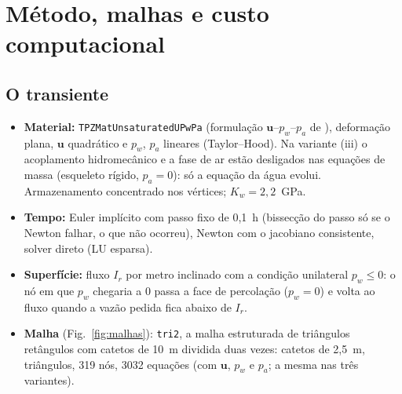 \section{Método, malhas e custo computacional}\label{sec:metodo}

\subsection{O transiente}
\begin{itemize}
  \item \textbf{Material:} \texttt{TPZMatUnsaturatedUPwPa} (formulação $\mathbf u$--$p_w$--$p_a$ de
    ), deformação plana, $\mathbf u$ quadrático e $p_w$, $p_a$ lineares (Taylor--Hood). Na
    variante (iii) o acoplamento hidromecânico e a fase de ar estão desligados nas equações de massa (esqueleto rígido,
    $p_a = 0$): só a equação da água evolui. Armazenamento concentrado nos vértices; $K_w = 2{,}2$~GPa.
  \item \textbf{Tempo:} Euler implícito com passo fixo de 0,1~h (bissecção do passo só se o Newton falhar, o que não
    ocorreu), Newton com o jacobiano consistente, solver direto (LU esparsa).
  \item \textbf{Superfície:} fluxo $I_r$ por metro inclinado com a condição unilateral $p_w \le 0$: o nó em que $p_w$
    chegaria a 0 passa a face de percolação ($p_w = 0$) e volta ao fluxo quando a vazão pedida fica abaixo de $I_r$.
  \item \textbf{Malha} (Fig.~\ref{fig:malhas}): \texttt{tri2}, a malha estruturada de triângulos retângulos com catetos
    de 10~m dividida duas vezes: catetos de 2,5~m, \nTriTrans{} triângulos, 319 nós, 3032 equações (com $\mathbf u$,
    $p_w$ e $p_a$; a mesma nas três variantes).
\end{itemize}

